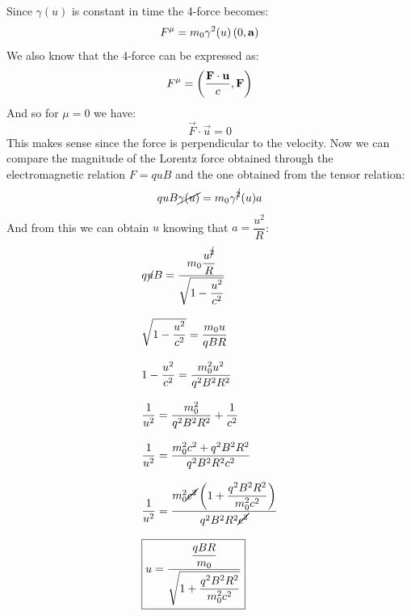 Since $\gamma(u)$ is constant in time the 4-force becomes:
\begin{equation}
  F^{\mu} = m_0 \gamma^2(u)\left(0, \vb{a}\right)
\end{equation}
We also know that the 4-force can be expressed as:
\begin{equation}
  F^{\mu} = \left(\dfrac{\vb{F}\cdot \vb{u}}{c}, \vb{F}\right)
\end{equation}
And so for $\mu = 0$ we have:
\begin{equation}
  \vec{F}\cdot \vec{u} = 0
\end{equation}
This makes sense since the force is perpendicular to the velocity. Now we can compare the magnitude of the Lorentz force obtained through the electromagnetic relation $F = quB$ and the one obtained from the tensor relation:
\begin{equation}
  quB\cancel{\gamma(u)} = m_0\gamma^{\cancel{2}}(u)a
\end{equation}
And from this we can obtain $u$ knowing that $a = \dfrac{u^2}{R}$:
\begin{equation}
  \begin{split}
    &q\cancel{u}B = \dfrac{m_0\dfrac{u^{\cancel{2}}}{R}}{\sqrt{1-\dfrac{u^2}{c^2}}} \\[8pt]
    &\sqrt{1-\dfrac{u^2}{c^2}} = \dfrac{m_0u}{qBR} \\[8pt]
    &1-\dfrac{u^2}{c^2} = \dfrac{m_0^2u^2}{q^2B^2R^2} \\[8pt]
    &\dfrac{1}{u^2} = \dfrac{m_0^2}{q^2B^2R^2} + \dfrac{1}{c^2} \\[8pt]
    &\dfrac{1}{u^2} = \dfrac{m_0^2c^2 + q^2B^2R^2}{q^2B^2R^2c^2} \\[8pt]
    &\dfrac{1}{u^2} = \dfrac{m_0^2\cancel{c^2}\left(1 + \dfrac{q^2B^2R^2}{m_0^2c^2}\right)}{q^2B^2R^2\cancel{c^2}} \\[8pt]
    &\boxed{u = \dfrac{\dfrac{qBR}{m_0}}{\sqrt{1 + \dfrac{q^2B^2R^2}{m_0^2c^2}}}}
  \end{split}
\end{equation}
